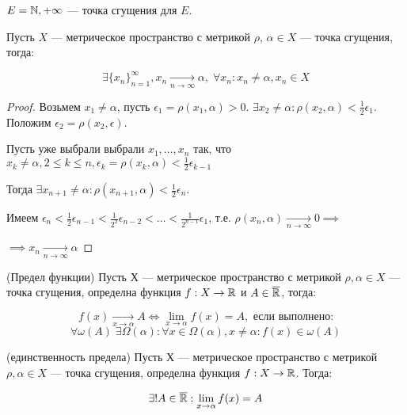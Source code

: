 \begin{eg}
    $E = \mathbb{N}, +\infty$ --- точка сгущения для $E$.
\end{eg}

\begin{theorem} 
    Пусть $X$ --- метрическое пространство с метрикой $\rho$, $\alpha \in X$ --- точка сгущения, тогда:

    $$\exists \{x_n\}_{n=1}^{\infty}, x_n \underset{n \to \infty}{\to} \alpha, \; \forall x_n: x_n \neq \alpha, x_n \in X$$
\end{theorem}

\begin{proof}
    Возьмем $x_1 \neq \alpha$, пусть $\epsilon_1 = \rho(x_1, \alpha) > 0$. 
    $\exists x_2 \neq \alpha: \rho(x_2, \alpha) < \frac{1}{2} \epsilon_1$. Положим $\epsilon_2 = \rho(x_2, \epsilon)$.
    
    Пусть уже выбрали выбрали 
    $x_1, \ldots, x_n$ так, что $x_k \neq \alpha, 2 \leq k \leq n, \epsilon_k = \rho(x_k, \alpha) < \frac{1}{2} \epsilon_{k-1}$

    Тогда $\exists x_{n+1} \neq \alpha: \rho(x_{n+1}, \alpha) < \frac{1}{2}\epsilon_n$.
    
    Имеем $\epsilon_n < \frac{1}{2}\epsilon_{n-1} < \frac{1}{2^2}\epsilon_{n-2} < \ldots < \frac{1}{2^{n-1}}\epsilon_1$, 
    т.е. $\rho(x_n, \alpha) \underset{n \to \infty}{\to} 0 \implies$

    $\implies x_n \underset{n \to \infty}{\to} \alpha$
\end{proof}

\begin{definition} (Предел функции)
    Пусть Х --- метрическое пространство с метрикой $\rho, \alpha \in X$ --- точка сгущения, определна функция $f: X \to \mathbb{R}$ и $A \in \overline{\mathbb{R}}$, тогда:

    $$f(x) \underset{x \to \alpha}{\to} A \Leftrightarrow \lim_{x \to \alpha}f(x) = A, \text{ если выполнено:}$$
    $$\forall \omega(A) \; \exists \Omega(\alpha): \forall x \in \Omega(\alpha), x \neq \alpha: f(x) \in \omega(A)$$
\end{definition}

\begin{theorem} (единственность предела)
    Пусть Х --- метрическое пространство с метрикой $\rho, \alpha \in X$ --- точка сгущения, определна функция $f: X \to \mathbb{R}$. Тогда:

    $$\exists! A \in \overline{\R}: \lim_{x \to \alpha}f(x) = A$$
\end{theorem}

